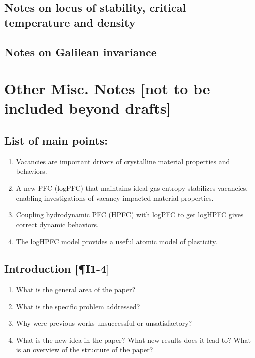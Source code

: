 \documentclass[%
 reprint,
 amsmath,amssymb,
 aps,
 prl,
]{revtex4-2}
\begin{document}
\subsection{Notes on locus of stability, critical\\ temperature and density}

\subsection{Notes on Galilean invariance}

\section{Other Misc. Notes [not to be included beyond drafts]}

\subsection{List of main points:}
\begin{enumerate}
    \item Vacancies are important drivers of crystalline material properties and behaviors.
    \item A new PFC (logPFC) that maintains ideal gas entropy stabilizes vacancies, enabling investigations of vacancy-impacted material properties.
    \item Coupling hydrodynamic PFC (HPFC) with logPFC to get logHPFC gives correct dynamic behaviors.
    \item The logHPFC model provides a useful atomic model of plasticity.
\end{enumerate}

\subsection{Introduction [\P I1-4]}
\begin{enumerate}[label=Intro\arabic*] %
    \item What is the general area of the paper? \label{outline-intro1}
    \item What is the specific problem addressed? \label{outline-intro2}
    \item Why were previous works unsuccessful or unsatisfactory? \label{outline-intro3}
    \item What is the new idea in the paper? What new results does it lead to? What is an overview of the structure of the paper? \label{outline-intro4}
\end{enumerate}
\end{document}
